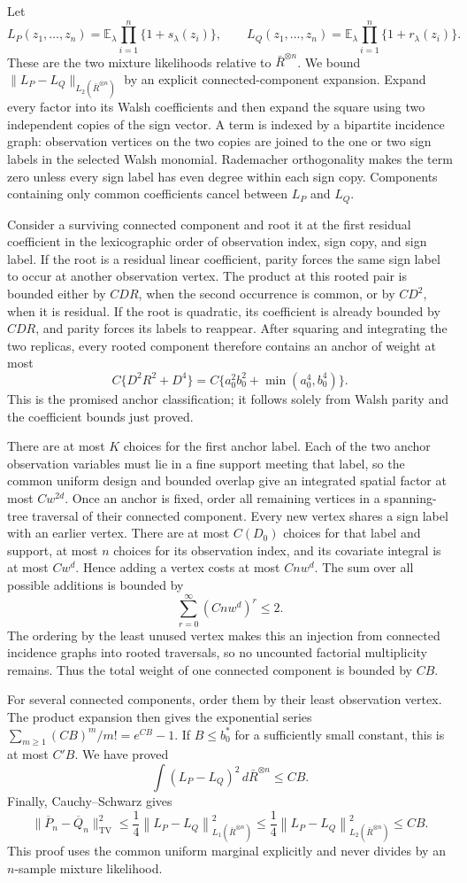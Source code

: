 Let
\[
 L_P(z_1,\ldots,z_n)=\mathbb E_\lambda\prod_{i=1}^n\{1+s_\lambda(z_i)\},
 \qquad
 L_Q(z_1,\ldots,z_n)=\mathbb E_\lambda\prod_{i=1}^n\{1+r_\lambda(z_i)\}.
\]
These are the two mixture likelihoods relative to \(\bar R^{\otimes n}\). We bound \(\|L_P-L_Q\|_{L_2(\bar R^{\otimes n})}\) by an explicit connected-component expansion. Expand every factor into its Walsh coefficients and then expand the square using two independent copies of the sign vector. A term is indexed by a bipartite incidence graph: observation vertices on the two copies are joined to the one or two sign labels in the selected Walsh monomial. Rademacher orthogonality makes the term zero unless every sign label has even degree within each sign copy. Components containing only common coefficients cancel between \(L_P\) and \(L_Q\).

Consider a surviving connected component and root it at the first residual coefficient in the lexicographic order of observation index, sign copy, and sign label. If the root is a residual linear coefficient, parity forces the same sign label to occur at another observation vertex. The product at this rooted pair is bounded either by \(CDR\), when the second occurrence is common, or by \(CD^2\), when it is residual. If the root is quadratic, its coefficient is already bounded by \(CDR\), and parity forces its labels to reappear. After squaring and integrating the two replicas, every rooted component therefore contains an anchor of weight at most
\[
 C\{D^2R^2+D^4\}
 =C\{a_0^2b_0^2+\min(a_0^4,b_0^4)\}.
\]
This is the promised anchor classification; it follows solely from Walsh parity and the coefficient bounds just proved.

There are at most \(K\) choices for the first anchor label. Each of the two anchor observation variables must lie in a fine support meeting that label, so the common uniform design and bounded overlap give an integrated spatial factor at most \(Cw^{2d}\). Once an anchor is fixed, order all remaining vertices in a spanning-tree traversal of their connected component. Every new vertex shares a sign label with an earlier vertex. There are at most \(C(D_0)\) choices for that label and support, at most \(n\) choices for its observation index, and its covariate integral is at most \(Cw^d\). Hence adding a vertex costs at most \(Cnw^d\). The sum over all possible additions is bounded by
\[
 \sum_{r=0}^\infty(Cnw^d)^r\le2.
\]
The ordering by the least unused vertex makes this an injection from connected incidence graphs into rooted traversals, so no uncounted factorial multiplicity remains. Thus the total weight of one connected component is bounded by \(CB\).

For several connected components, order them by their least observation vertex. The product expansion then gives the exponential series \(\sum_{m\ge1}(CB)^m/m!=e^{CB}-1\). If \(B\le b_0^*\) for a sufficiently small constant, this is at most \(C'B\). We have proved
\[
 \int(L_P-L_Q)^2\,d\bar R^{\otimes n}\le CB.
\]
Finally, Cauchy--Schwarz gives
\[
 \|\overline P_n-\overline Q_n\|_{\mathrm{TV}}^2
 \le\frac14\left\|L_P-L_Q\right\|_{L_1(\bar R^{\otimes n})}^2
 \le\frac14\left\|L_P-L_Q\right\|_{L_2(\bar R^{\otimes n})}^2
 \le CB.
\]
This proof uses the common uniform marginal explicitly and never divides by an \(n\)-sample mixture likelihood.